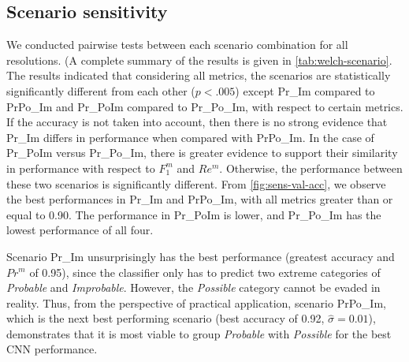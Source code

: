\documentclass[Journal, letterpaper, DoubleSpace, InsideFigs]{ascelike-new}
\begin{document}

\subsection{Scenario sensitivity}
We conducted pairwise tests between each scenario combination for all resolutions. (A complete summary of the results is given in \autoref{tab:welch-scenario}.
The results indicated that considering all metrics, the scenarios are statistically significantly different from each other ($p < .005$) except Pr\_Im compared to PrPo\_Im and Pr\_PoIm compared to Pr\_Po\_Im, with respect to certain metrics.
If the accuracy is not taken into account, then there is no strong evidence that Pr\_Im differs in performance when compared with PrPo\_Im.
In the case of Pr\_PoIm versus Pr\_Po\_Im, there is greater evidence to support their similarity in performance 
with respect to  $F_{1}^{m}$ and $Re^{m}$. %
Otherwise, the performance between these two scenarios is significantly different.
From \autoref{fig:sens-val-acc}, we observe the best performances in Pr\_Im and PrPo\_Im, with all metrics greater than or equal to 0.90.
The performance in Pr\_PoIm is lower, and Pr\_Po\_Im has the lowest performance of all four.


Scenario Pr\_Im unsurprisingly has the best performance (greatest accuracy and $Pr^{m}$ of 0.95), since the
classifier only has to predict two extreme categories of \textit{Probable} and \textit{Improbable}.  However, the
\textit{Possible} category cannot be evaded in reality.  Thus, from the perspective of practical application, scenario
PrPo\_Im, which is the next best performing scenario (best accuracy of 0.92, $\hat\sigma=0.01$), demonstrates that it is
most viable to group \textit{Probable} with \textit{Possible} for the best CNN performance.
\end{document}
